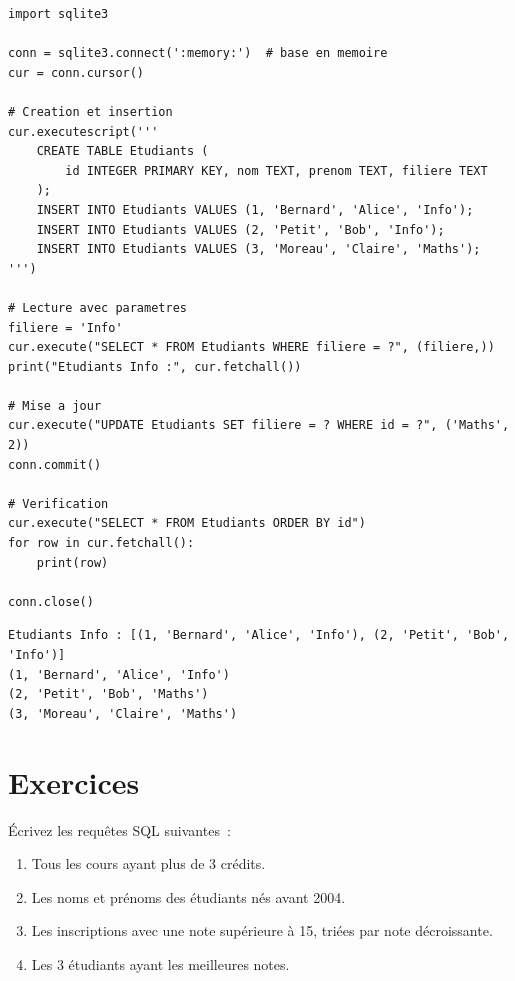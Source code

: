 \begin{codeblock}[title=\textbf{CRUD complet avec Python/sqlite3}]
\begin{verbatim}
import sqlite3

conn = sqlite3.connect(':memory:')  # base en memoire
cur = conn.cursor()

# Creation et insertion
cur.executescript('''
    CREATE TABLE Etudiants (
        id INTEGER PRIMARY KEY, nom TEXT, prenom TEXT, filiere TEXT
    );
    INSERT INTO Etudiants VALUES (1, 'Bernard', 'Alice', 'Info');
    INSERT INTO Etudiants VALUES (2, 'Petit', 'Bob', 'Info');
    INSERT INTO Etudiants VALUES (3, 'Moreau', 'Claire', 'Maths');
''')

# Lecture avec parametres
filiere = 'Info'
cur.execute("SELECT * FROM Etudiants WHERE filiere = ?", (filiere,))
print("Etudiants Info :", cur.fetchall())

# Mise a jour
cur.execute("UPDATE Etudiants SET filiere = ? WHERE id = ?", ('Maths', 2))
conn.commit()

# Verification
cur.execute("SELECT * FROM Etudiants ORDER BY id")
for row in cur.fetchall():
    print(row)

conn.close()
\end{verbatim}
\end{codeblock}

\begin{codeoutput}
\begin{verbatim}
Etudiants Info : [(1, 'Bernard', 'Alice', 'Info'), (2, 'Petit', 'Bob', 'Info')]
(1, 'Bernard', 'Alice', 'Info')
(2, 'Petit', 'Bob', 'Maths')
(3, 'Moreau', 'Claire', 'Maths')
\end{verbatim}
\end{codeoutput}

\section*{Exercices}

\begin{exercice}
\'Ecrivez les requ\^etes SQL suivantes~:
\begin{enumerate}
    \item Tous les cours ayant plus de 3 cr\'edits.
    \item Les noms et pr\'enoms des \'etudiants n\'es avant 2004.
    \item Les inscriptions avec une note sup\'erieure \`a 15, tri\'ees par note d\'ecroissante.
    \item Les 3 \'etudiants ayant les meilleures notes.
\end{enumerate}
\end{exercice}

